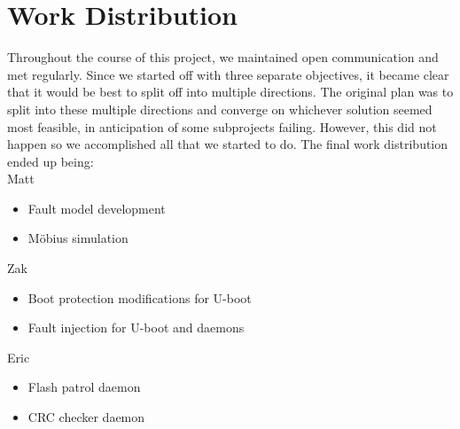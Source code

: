 \section{Work Distribution}\label{sec:team}
Throughout the course of this project, we maintained open communication and met
regularly.  Since we started off with three separate objectives, it became clear
that it would be best to split off into multiple directions.  The original plan
was to split into these multiple directions and converge on whichever solution
seemed most feasible, in anticipation of some subprojects failing.  However,
this did not happen so we accomplished all that we started to do.  The final
work distribution ended up being:\\

\noindent Matt
\begin{itemize}
  \item{Fault model development}
  \item{M\"obius simulation}
\end{itemize} 
\noindent Zak
\begin{itemize}
  \item{Boot protection modifications for U-boot}
  \item{Fault injection for U-boot and daemons}
\end{itemize}
\noindent Eric
\begin{itemize}
  \item{Flash patrol daemon}
  \item{CRC checker daemon}
\end{itemize}
